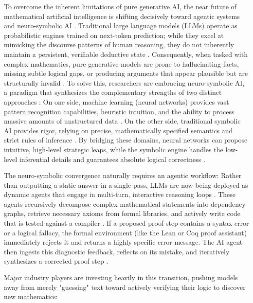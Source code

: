 To overcome the inherent limitations of pure generative AI, the near future of mathematical artificial intelligence is shifting decisively toward agentic systems and neuro-symbolic AI \cite{asperti_thinking_2026, avigad_mathematics_2024}. Traditional large language models (LLMs) operate as probabilistic engines trained on next-token prediction; while they excel at mimicking the discourse patterns of human reasoning, they do not inherently maintain a persistent, verifiable deductive state \cite{asperti_thinking_2026}. Consequently, when tasked with complex mathematics, pure generative models are prone to hallucinating facts, missing subtle logical gaps, or producing arguments that appear plausible but are structurally invalid \cite{asperti_thinking_2026, biyani_indimathbench_2025-1, wang_m2f_2026}. To solve this, researchers are embracing neuro-symbolic AI, a paradigm that synthesizes the complementary strengths of two distinct approaches \cite{avigad_mathematics_2024}: On one side, machine learning (neural networks) provides vast pattern recognition capabilities, heuristic intuition, and the ability to process massive amounts of unstructured data \cite{avigad_mathematics_2024}. On the other side, traditional symbolic AI provides rigor, relying on precise, mathematically specified semantics and strict rules of inference \cite{avigad_mathematics_2024}. By bridging these domains, neural networks can propose intuitive, high-level strategic leaps, while the symbolic engine handles the low-level inferential details and guarantees absolute logical correctness \cite{avigad_mathematics_2024, asperti_thinking_2026}.

The neuro-symbolic convergence naturally requires an agentic workflow: Rather than outputting a static answer in a single pass, LLMs are now being deployed as dynamic agents that engage in multi-turn, interactive reasoning loops \cite{asperti_thinking_2026}. These agents recursively decompose complex mathematical statements into dependency graphs, retrieve necessary axioms from formal libraries, and actively write code that is tested against a compiler \cite{wang_aria_2025}. If a proposed proof step contains a syntax error or a logical fallacy, the formal environment (like the Lean or Coq proof assistant) immediately rejects it and returns a highly specific error message. The AI agent then ingests this diagnostic feedback, reflects on its mistake, and iteratively synthesizes a corrected proof step \cite{doan_ai-assisted_2025, li_sita_2025}.

Major industry players are investing heavily in this transition, pushing models away from merely "guessing" text toward actively verifying their logic to discover new mathematics:

